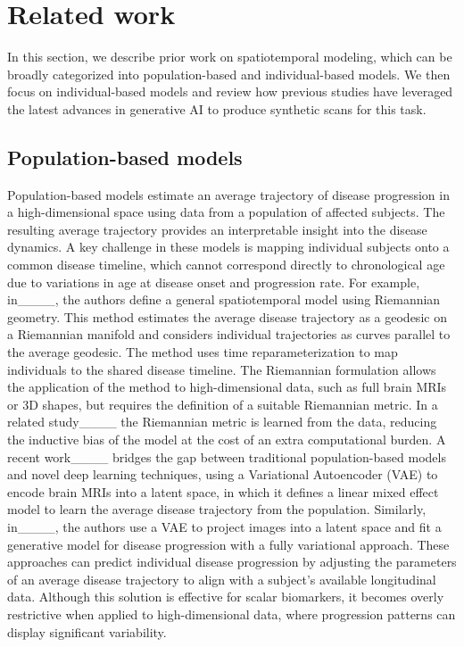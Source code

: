 \section{Related work}
In this section, we describe prior work on spatiotemporal modeling, which can be broadly categorized into population-based and individual-based models. We then focus on individual-based models and review how previous studies have leveraged the latest advances in generative AI to produce synthetic scans for this task. 

\subsection{Population-based models}
Population-based models estimate an average trajectory of disease progression in a high-dimensional space using data from a population of affected subjects. The resulting average trajectory provides an interpretable insight into the disease dynamics. A key challenge in these models is mapping individual subjects onto a common disease timeline, which cannot correspond directly to chronological age due to variations in age at disease onset and progression rate. For example, in____, the authors define a general spatiotemporal model using Riemannian geometry. This method estimates the average disease trajectory as a geodesic on a Riemannian manifold and considers individual trajectories as curves parallel to the average geodesic. The method uses time reparameterization to map individuals to the shared disease timeline. The Riemannian formulation allows the application of the method to high-dimensional data, such as full brain MRIs or 3D shapes, but requires the definition of a suitable Riemannian metric. In a related study____ the Riemannian metric is learned from the data, reducing the inductive bias of the model at the cost of an extra computational burden. A recent work____ bridges the gap between traditional population-based models and novel deep learning techniques, using a Variational Autoencoder (VAE) to encode brain MRIs into a latent space, in which it defines a linear mixed effect model to learn the average disease trajectory from the population. Similarly, in____, the authors use a VAE to project images into a latent space and fit a generative model for disease progression with a fully variational approach. These approaches can predict individual disease progression by adjusting the parameters of an average disease trajectory to align with a subject's available longitudinal data. Although this solution is effective for scalar biomarkers, it becomes overly restrictive when applied to high-dimensional data, where progression patterns can display significant variability.



